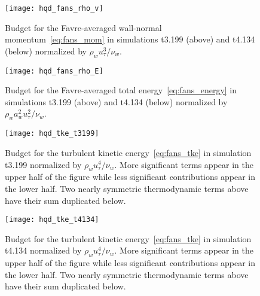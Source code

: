 \begin{figure}
\centering
\texttt{[image: hqd\_fans\_rho\_v]}
\caption[Wall-normal momentum equation budget for cases t3.199 and t4.134]{%
    Budget for the Favre-averaged wall-normal momentum~\eqref{eq:fans_mom}
    in simulations t3.199 (above) and t4.134 (below)
    normalized by $\rho_w u_\tau^3 / \nu_w$.\label{fig:fans_rho_v}
}
\end{figure}


\begin{figure}
\centering
\texttt{[image: hqd\_fans\_rho\_E]}
\caption[Total energy equation budget for simulations t3.199 and t4.134]{%
    Budget for the Favre-averaged total energy~\eqref{eq:fans_energy}
    in simulations t3.199 (above) and t4.134 (below) normalized by
    $\rho_w a_w^2 u_\tau^2 / \nu_w$.\label{fig:fans_rho_E}
}
\end{figure}

\begin{figure}
\centering
\texttt{[image: hqd\_tke\_t3199]}
\caption[Turbulent kinetic energy equation budget for simulation t3.199]{%
    Budget for the turbulent kinetic energy~\eqref{eq:fans_tke} in simulation
    t3.199 normalized by $\rho_w u_\tau^4 / \nu_w$.  More significant terms
    appear in the upper half of the figure while less significant contributions
    appear in the lower half.  Two nearly symmetric thermodynamic terms
    above have their sum duplicated below.\label{fig:tke_t3199}
}
\end{figure}

\begin{figure}
\centering
\texttt{[image: hqd\_tke\_t4134]}
\caption[Turbulent kinetic energy equation budget for simulation t4.134]{%
    Budget for the turbulent kinetic energy~\eqref{eq:fans_tke} in simulation
    t4.134 normalized by $\rho_w u_\tau^4 / \nu_w$.  More significant terms
    appear in the upper half of the figure while less significant contributions
    appear in the lower half.  Two nearly symmetric thermodynamic terms
    above have their sum duplicated below.\label{fig:tke_t4134}
}
\end{figure}
